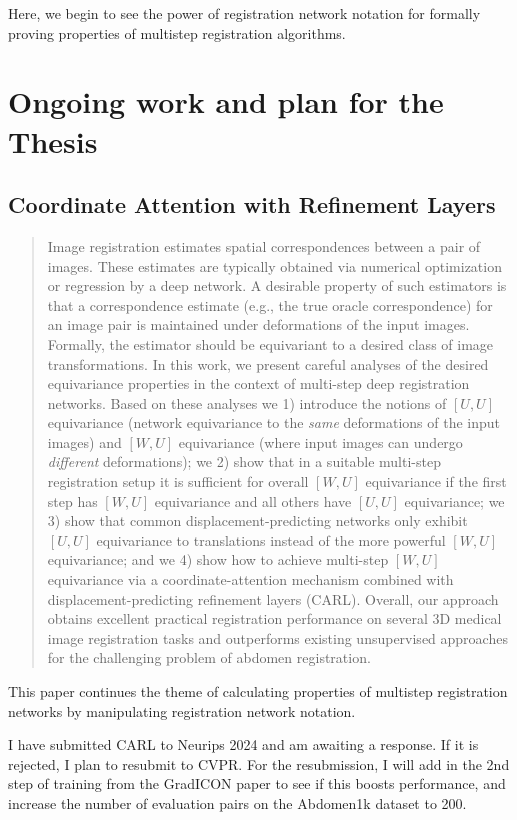 \documentclass{article}
\begin{document}
Here, we begin to see the power of registration network notation for formally
proving properties of multistep registration algorithms.
\section{Ongoing work and plan for the Thesis}

\subsection{Coordinate Attention with Refinement Layers}

\begin{abstract}
	Image registration estimates spatial correspondences between a pair of images. These estimates are typically obtained via numerical optimization or regression by a deep network. A desirable property of such estimators is that a correspondence estimate (e.g., the true oracle correspondence) for an image pair is maintained under deformations of the input images. Formally, the estimator should be equivariant to a desired class of image transformations. In this work, we present careful analyses of the desired equivariance properties in the context of multi-step deep registration networks. Based on these analyses we 1) introduce the notions of $[U,U]$ equivariance (network equivariance to the \emph{same} deformations of the input images) and $[W,U]$ equivariance (where input images can undergo \emph{different} deformations); we 2) show that in a suitable multi-step registration setup it is sufficient for overall $[W,U]$ equivariance if the first step has $[W,U]$ equivariance and all others have $[U,U]$ equivariance; we 3) show that common displacement-predicting networks only exhibit $[U,U]$ equivariance to translations instead of the more powerful $[W,U]$ equivariance; and we 4) show how to achieve multi-step $[W,U]$ equivariance via a coordinate-attention mechanism combined with displacement-predicting refinement layers (CARL). Overall, our approach obtains excellent practical registration performance on several 3D medical image registration tasks and outperforms existing unsupervised approaches for the challenging problem of abdomen registration.
\end{abstract}

This paper continues the theme of calculating properties of multistep
registration networks by manipulating registration network notation.

I have submitted CARL to Neurips 2024 and am awaiting a response. If it is
rejected, I plan to resubmit to CVPR. For the resubmission, I will add in the 2nd step of training from the GradICON paper to see if this boosts performance, and increase the number of evaluation pairs on the Abdomen1k dataset to 200.
\end{document}
